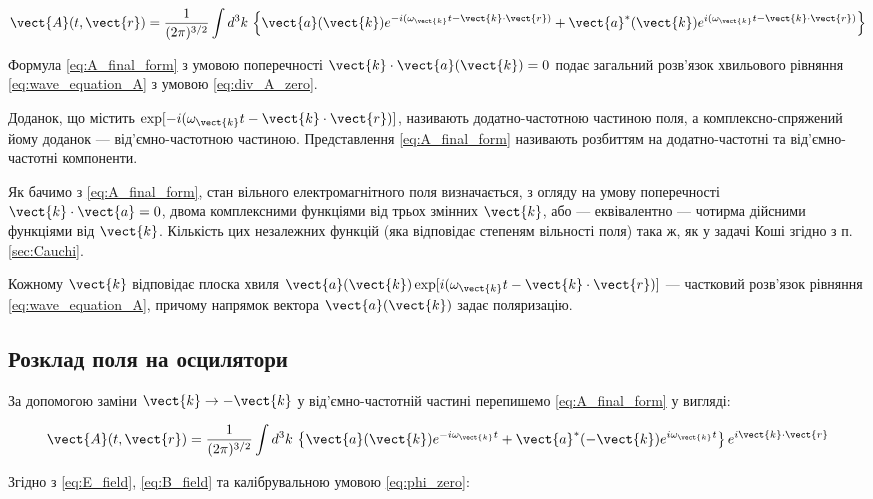 \begin{equation}
\vect{A}(t, \vect{r}) = \frac{1}{(2\pi)^{3/2}} \int d^3k \, \left\{ \vect{a}(\vect{k}) e^{-i(\omega_{\vect{k}} t - \vect{k} \cdot \vect{r})} +
\vect{a}^*(\vect{k}) e^{i(\omega_{\vect{k}} t - \vect{k} \cdot \vect{r})} \right\}
\label{eq:A_final_form}
\end{equation}

Формула \eqref{eq:A_final_form} з умовою поперечності \(\vect{k} \cdot \vect{a}(\vect{k}) = 0\) подає загальний розв’язок хвильового рівняння
\eqref{eq:wave_equation_A} з умовою \eqref{eq:div_A_zero}.

Доданок, що містить \(\exp[-i(\omega_{\vect{k}} t - \vect{k} \cdot \vect{r})]\), називають додатно-частотною частиною поля, а комплексно-спряжений йому
доданок --- від’ємно-частотною частиною. Представлення \eqref{eq:A_final_form} називають розбиттям на додатно-частотні та від’ємно-частотні компоненти.

Як бачимо з \eqref{eq:A_final_form}, стан вільного електромагнітного поля визначається, з огляду на умову поперечності \(\vect{k} \cdot \vect{a} = 0\),
двома комплексними функціями від трьох змінних \(\vect{k}\), або --- еквівалентно --- чотирма дійсними функціями від \(\vect{k}\). Кількість цих
незалежних функцій (яка відповідає степеням вільності поля) така ж, як у задачі Коші згідно з п. \ref{sec:Cauchi}.

Кожному \(\vect{k}\) відповідає плоска хвиля \(\vect{a}(\vect{k}) \exp[i(\omega_{\vect{k}} t - \vect{k} \cdot \vect{r})]\) --- частковий розв’язок
рівняння \eqref{eq:wave_equation_A}, причому напрямок вектора \(\vect{a}(\vect{k})\) задає поляризацію.


\subsection*{Розклад поля на осцилятори}

За допомогою заміни \(\vect{k} \rightarrow -\vect{k}\) у від’ємно-частотній частині перепишемо \eqref{eq:A_final_form} у вигляді:

\begin{equation}
\vect{A}(t, \vect{r}) = \frac{1}{(2\pi)^{3/2}} \int d^3k \, \left\{ \vect{a}(\vect{k}) e^{-i\omega_{\vect{k}} t} + \vect{a}^*(-\vect{k})
e^{i\omega_{\vect{k}} t} \right\} e^{i\vect{k} \cdot \vect{r}}
\label{eq:A_final_form_modified}
\end{equation}

Згідно з \eqref{eq:E_field}, \eqref{eq:B_field} та калібрувальною умовою \eqref{eq:phi_zero}:

